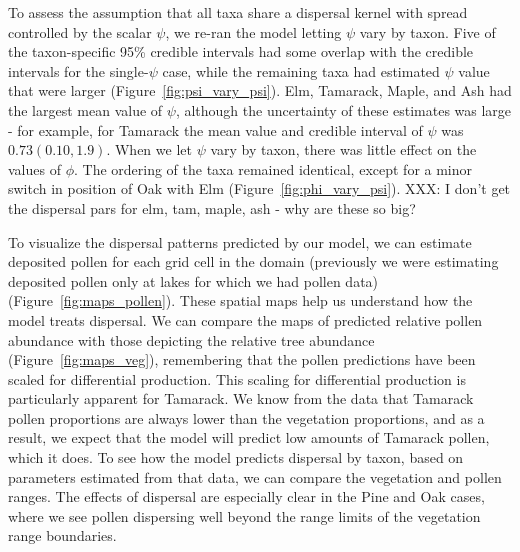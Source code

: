 \documentclass[12pt]{article}
\begin{document}
To assess the assumption that all taxa share a dispersal kernel with
spread controlled by the scalar $\psi$, we re-ran the model letting
$\psi$ vary by taxon. Five of the taxon-specific 95\% credible
intervals had some overlap with the credible intervals for the
single-$\psi$ case, while the remaining taxa had estimated $\psi$
value that were larger (Figure~\ref{fig:psi_vary_psi}). Elm, Tamarack,
Maple, and Ash had the largest mean value of $\psi$, although the
uncertainty of these estimates was large - for example, for Tamarack
the mean value and credible interval of $\psi$ was $0.73 (0.10,
1.9)$. When we let $\psi$ vary by taxon, there was little effect on
the values of $\phi$. The ordering of the taxa remained identical,
except for a minor switch in position of Oak with Elm
(Figure~\ref{fig:phi_vary_psi}). XXX: I don't get the dispersal pars
for elm, tam, maple, ash - why are these so big?



To visualize the dispersal patterns predicted by our model, we can
estimate deposited pollen for each grid cell in the domain (previously
we were estimating deposited pollen only at lakes for which we had
pollen data) (Figure~\ref{fig:maps_pollen}). These spatial maps help
us understand how the model treats dispersal. We can compare the maps
of predicted relative pollen abundance with those depicting the
relative tree abundance (Figure~\ref{fig:maps_veg}), remembering that the pollen predictions have
been scaled for differential production. This scaling for differential
production is particularly apparent for Tamarack. We know from the
data that Tamarack pollen proportions are always lower than the
vegetation proportions, and as a result, we expect that the model will
predict low amounts of Tamarack pollen, which it does. To see how the
model predicts dispersal by taxon, based on parameters estimated from
that data, we can compare the vegetation and pollen ranges. The
effects of dispersal are especially clear in the Pine and Oak cases,
where we see pollen dispersing well beyond the range limits of the
vegetation range boundaries.


\end{document}
